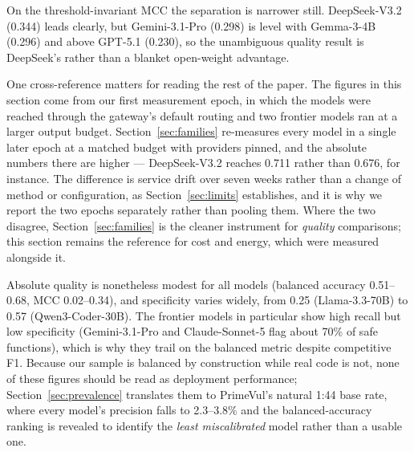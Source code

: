 \documentclass[computers,article,submit,moreauthors]{Definitions/mdpi}
\begin{document}
On the threshold-invariant MCC the separation is narrower still. DeepSeek-V3.2 (0.344) leads clearly, but Gemini-3.1-Pro (0.298) is level with Gemma-3-4B (0.296) and above GPT-5.1 (0.230), so the unambiguous quality result is DeepSeek's rather than a blanket open-weight advantage.

One cross-reference matters for reading the rest of the paper. The figures in this section come from our first measurement epoch, in which the models were reached through the gateway's default routing and two frontier models ran at a larger output budget. Section~\ref{sec:families} re-measures every model in a single later epoch at a matched budget with providers pinned, and the absolute numbers there are higher --- DeepSeek-V3.2 reaches 0.711 rather than 0.676, for instance. The difference is service drift over seven weeks rather than a change of method or configuration, as Section~\ref{sec:limits} establishes, and it is why we report the two epochs separately rather than pooling them. Where the two disagree, Section~\ref{sec:families} is the cleaner instrument for \emph{quality} comparisons; this section remains the reference for cost and energy, which were measured alongside it.

Absolute quality is nonetheless modest for all models (balanced accuracy 0.51--0.68, MCC 0.02--0.34), and specificity varies widely, from 0.25 (Llama-3.3-70B) to 0.57 (Qwen3-Coder-30B). The frontier models in particular show high recall but low specificity (Gemini-3.1-Pro and Claude-Sonnet-5 flag about 70\% of safe functions), which is why they trail on the balanced metric despite competitive F1. Because our sample is balanced by construction while real code is not, none of these figures should be read as deployment performance; Section~\ref{sec:prevalence} translates them to PrimeVul's natural 1:44 base rate, where every model's precision falls to 2.3--3.8\% and the balanced-accuracy ranking is revealed to identify the \emph{least miscalibrated} model rather than a usable one.
\end{document}
